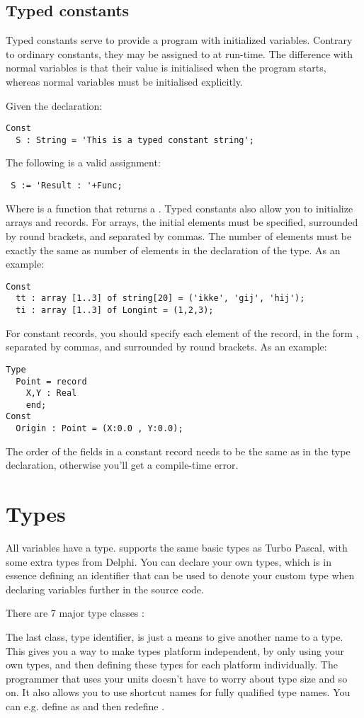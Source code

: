 \documentclass{report}
\begin{document}
\section{Typed constants}
Typed constants serve to provide a program with initialized variables.
Contrary to ordinary constants, they may be assigned to at run-time.
The difference with normal variables is that their value is initialised
when the program starts, whereas normal variables must be initialised
explicitly.

Given the declaration:
\begin{verbatim}
Const
  S : String = 'This is a typed constant string';
\end{verbatim}
The following is a valid assignment:
\begin{verbatim}
 S := 'Result : '+Func;
\end{verbatim}
Where  is a function that returns a .
Typed constants also allow you to initialize arrays and records. For arrays,
the initial elements must be specified, surrounded by round brackets, and
separated by commas. The number of elements must be exactly the same as
number of elements in the declaration of the type.
As an example:
\begin{verbatim}
Const
  tt : array [1..3] of string[20] = ('ikke', 'gij', 'hij');
  ti : array [1..3] of Longint = (1,2,3);
\end{verbatim}
For constant records, you should specify each element of the record, in the
form , separated by commas, and surrounded by round
brackets.
As an example:
\begin{verbatim}
Type
  Point = record
    X,Y : Real
    end;
Const
  Origin : Point = (X:0.0 , Y:0.0);
\end{verbatim}
The order of the fields in a constant record needs to be the same as in the type declaration,
otherwise you'll get a compile-time error.
\chapter{Types}
All variables have a type. \fpc supports the same basic types as Turbo
Pascal, with some extra types from Delphi.
You can declare your own types, which is in essence defining an identifier
that can be used to denote your custom type when declaring variables further
in the source code.

There are 7 major type classes :

The last class, {\sffamily type identifier}, is just a means to give another
name to a type. This gives you a way to make types platform independent, by
only using your own types, and then defining these types for each platform
individually. The programmer that uses your units doesn't have to worry
about type size and so on. It also allows you to use shortcut names for
fully qualified type names. You can e.g. define  as
 and then redefine .
\end{document}
